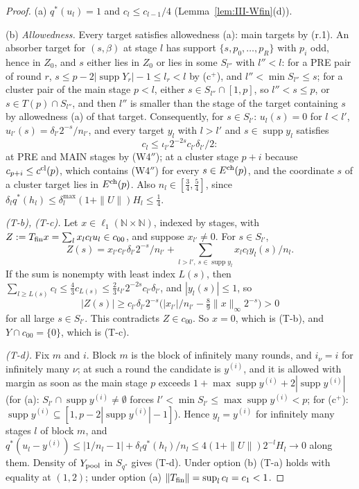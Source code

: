 \documentclass[10pt]{amsart}
\theoremstyle{definition}
\theoremstyle{remark}
\newcommand{\supp}{\operatorname{supp}}
\newcommand{\N}{\mathbb N}
\begin{document}
\begin{proof}
(a) $q^*(u_l)=1$ and $c_l\le c_{l-1}/4$ (Lemma~\ref{lem:III-Wfin}(d)).

(b) \emph{Allowedness.}  Every target satisfies allowedness (a): main targets
by (r.1).  An absorber target for $(s,\beta)$ at stage $l$ has support
$\{s,p_0,\dots,p_R\}$ with $p_i$ odd, hence in $Z_0$, and $s$ either lies in
$Z_0$ or lies in some $S_{l''}$ with $l''<l$: for a PRE pair of round $r$,
$s\le p-2|\supp Y_r|-1\le l_r<l$ by (c$^+$), and $l''<\min S_{l''}\le s$; for a
cluster pair of the main stage $p<l$, either $s\in S_{l''}\cap[1,p]$, so $l''<
s\le p$, or $s\in T(p)\cap S_{l''}$, and then $l''$ is smaller than the stage of
the target containing $s$ by allowedness (a) of that target.  Consequently, for
$s\in S_{l'}$: $u_l(s)=0$ for $l<l'$, $u_{l'}(s)=\delta_{l'}2^{-s}/n_{l'}$, and
every target $y_l$ with $l>l'$ and $s\in\supp y_l$ satisfies
\[
 c_l\le\iota_{l'}2^{-2s}c_{l'}\delta_{l'}/2 :
\]
at PRE and MAIN stages by (W4$''$); at a cluster stage $p+i$ because
$c_{p+i}\le c^{\rm cl}(p)$, which contains (W4$''$) for every $s\in E^{\rm ch}(p)$,
and the coordinate $s$ of a cluster target lies in $E^{\rm ch}(p)$.  Also $n_l\in
[\frac34,\frac54]$, since $\delta_lq^*(h_l)\le\delta^{\max}_l(1+\|U\|)H_l\le\frac14$.

\emph{(T-b), (T-c).}  Let $x\in\ell_1(\N\times\N)$, indexed by stages, with
$Z:=T_{\rm fin}x=\sum_lx_lc_lu_l\in c_{00}$, and suppose $x_{l'}\ne0$.  For
$s\in S_{l'}$,
\[
 Z(s)=x_{l'}c_{l'}\delta_{l'}2^{-s}/n_{l'}+\sum_{l>l',\ s\in\supp y_l}x_lc_ly_l(s)/n_l .
\]
If the sum is nonempty with least index $L(s)$, then $\sum_{l\ge L(s)}c_l\le
\frac43c_{L(s)}\le\frac23\iota_{l'}2^{-2s}c_{l'}\delta_{l'}$, and $|y_l(s)|\le1$,
so
\[
 |Z(s)|\ge c_{l'}\delta_{l'}2^{-s}\big(|x_{l'}|/n_{l'}-\tfrac89\|x\|_\infty2^{-s}\big)>0
\]
for all large $s\in S_{l'}$.  This contradicts $Z\in c_{00}$.  So $x=0$, which is
(T-b), and $Y\cap c_{00}=\{0\}$, which is (T-c).

\emph{(T-d).}  Fix $m$ and $i$.  Block $m$ is the block of infinitely many
rounds, and $i_\nu=i$ for infinitely many $\nu$; at such a round the candidate
is $y^{(i)}$, and it is allowed with margin as soon as the main stage $p$
exceeds $1+\max\supp y^{(i)}+2|\supp y^{(i)}|$ (for (a): $S_{l'}\cap\supp y^{(i)}
\ne\emptyset$ forces $l'<\min S_{l'}\le\max\supp y^{(i)}<p$; for (c$^+$):
$\supp y^{(i)}\subseteq[1,p-2|\supp y^{(i)}|-1]$).  Hence $y_l=y^{(i)}$ for
infinitely many stages $l$ of block $m$, and $q^*(u_l-y^{(i)})\le|1/n_l-1|+
\delta_lq^*(h_l)/n_l\le4(1+\|U\|)2^{-l}H_l\to0$ along them.  Density of
$Y_{\rm pool}$ in $S_{q^*}$ gives (T-d).  Under option (b) (T-a) holds with
equality at $(1,2)$; under option (a) $\|T_{\rm fin}\|=\sup_lc_l=c_1<1$.


\end{proof}
\end{document}

